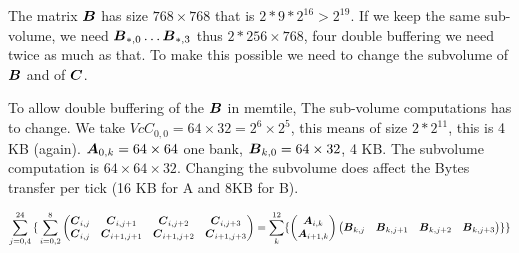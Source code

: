 \documentclass[conference]{IEEEtran}
\begin{document}
The matrix ${\boldsymbol B}$ has size $768 \times 768$ that is
$2*9*2^{16}>2^{19}$. If we keep the same sub-volume, we need
${\boldsymbol B}_{*,0} \dots {\boldsymbol B}_{*,3}$ thus $2*256 \times 768$, four double
buffering we need twice as much as that. To make this possible we need
to change the subvolume of ${\boldsymbol B}$ and of ${\boldsymbol C}$.

To allow double buffering of the ${\boldsymbol B}$ in memtile, The sub-volume
computations has to change. We take $Vc{C}_{0,0} = 64\times 32 = 2^6
\times 2^5$, this means of size $2*2^{11}$, this is 4 KB
(again). ${\boldsymbol A}_{0,k} = 64 \times 64$ one bank, ${\boldsymbol B}_{k,0} = 64
\times 32$, 4 KB. The subvolume computation is $64\times 64 \times
32$. Changing the subvolume does affect the Bytes transfer per tick
(16 KB for A and 8KB for B). 




{\small \begin{equation*}
    \sum_{j=0,4}^{24}
    { \{ } \sum_{i=0,2}^8 
  \begin{pmatrix}
    {\boldsymbol C}_{i,j}  & {\boldsymbol C}_{i,j+1}    & {\boldsymbol C}_{i,j+2}    &{\boldsymbol C}_{i,j+3} \\
    {\boldsymbol C}_{i,j}  & {\boldsymbol C}_{i+1,j+1}   & {\boldsymbol C}_{i+1,j+2}  & {\boldsymbol C}_{i+1,j+3} \\
  \end{pmatrix}    = \sum_k^{12}
  \{
  \begin{pmatrix}
    {\boldsymbol A}_{i,k}  \\
    {\boldsymbol A}_{i+1,k}   \\
  \end{pmatrix}  
  \begin{pmatrix}
    {\boldsymbol B}_{k,j}  &  {\boldsymbol B}_{k,j+1}  & {\boldsymbol B}_{k,j+2}  &{\boldsymbol B}_{k,j+3} \\
  \end{pmatrix}
  \}{ \}}    
\end{equation*}
}
\end{document}
